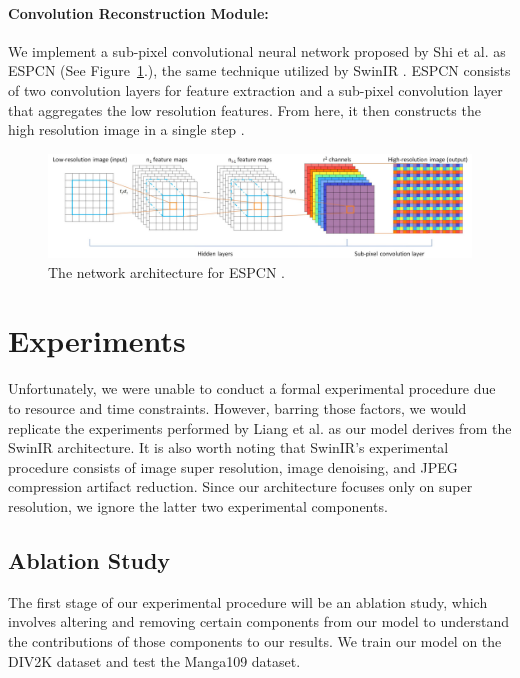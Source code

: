 \documentclass{article}
\begin{document}
\paragraph{Convolution Reconstruction Module:} We implement a sub-pixel convolutional neural network proposed by Shi et al. as ESPCN (See Figure~\ref{fig:escpn}.), the same technique utilized by SwinIR \citep{SwinIR, ESPCN}. ESPCN consists of two convolution layers for feature extraction and a sub-pixel convolution layer that aggregates the low resolution features. From here, it then constructs the high resolution image in a single step \citep{SwinIR, ESPCN}.


\begin{figure}
    \centering
    \includegraphics[width=\textwidth]{espcn.png}
    \caption{The network architecture for ESPCN \citep{ESPCN}.}
    \label{fig:escpn}
\end{figure}

\section{Experiments}

Unfortunately, we were unable to conduct a formal experimental procedure due to resource and time constraints. However, barring those factors, we would replicate the experiments performed by Liang et al. as our model derives from the SwinIR architecture. It is also worth noting that SwinIR's experimental procedure consists of image super resolution, image denoising, and JPEG compression artifact reduction. Since our architecture focuses only on super resolution, we ignore the latter two experimental components.

\subsection{Ablation Study}

The first stage of our experimental procedure will be an ablation study, which involves altering and removing certain components from our model to understand the contributions of those components to our results. We train our model on the DIV2K \citep{Div2K} dataset and test the Manga109 \citep{Manga109} dataset.
\end{document}
